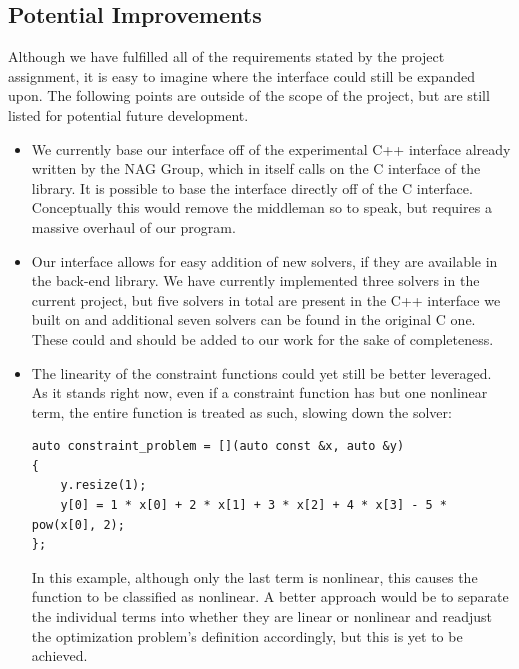 \documentclass{book}
\begin{document}
\subsection{Potential Improvements}
Although we have fulfilled all of the requirements stated by the project assignment, it is easy to imagine where the interface could still be expanded upon. The following points are outside of the scope of the project, but are still listed for potential future development. 
\begin{itemize}
\item We currently base our interface off of the experimental C++ interface already written by the NAG Group, which in itself calls on the C interface of the library. It is possible to base the interface directly off of the C interface. Conceptually this would remove the middleman so to speak, but requires a massive overhaul of our program.
\item Our interface allows for easy addition of new solvers, if they are available in the back-end library. We have currently implemented three solvers in the current project, but five solvers in total are present in the C++ interface we built on and additional seven solvers can be found in the original C one. These could and should be added to our work for the sake of completeness.
\item The linearity of the constraint functions could yet still be better leveraged. As it stands right now, even if a constraint function has but one nonlinear term, the entire function is treated as such, slowing down the solver:
\begin{lstlisting}[basicstyle=\normalsize]
auto constraint_problem = [](auto const &x, auto &y)
{
	y.resize(1);
	y[0] = 1 * x[0] + 2 * x[1] + 3 * x[2] + 4 * x[3] - 5 * pow(x[0], 2);
};
\end{lstlisting}
In this example, although only the last term is nonlinear, this causes the function to be classified as nonlinear. A better approach would be to separate the individual terms into whether they are linear or nonlinear and readjust the optimization problem’s definition accordingly, but this is yet to be achieved.
\end{itemize}
\end{document}
